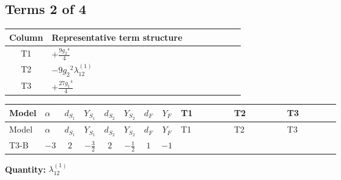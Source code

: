 \documentclass[8pt]{article}
\begin{document}
\begin{landscape}
\subsection*{Terms 2 of 4}
\begin{center}
\begin{tabular}{@{}c >{\raggedright\arraybackslash}p{0.82\linewidth}@{}}
\toprule
Column & Representative term structure \\
\midrule
T1 & \(\displaystyle +\frac{9 {g_2}^4}{4}\) \\
\midrule
T2 & \(\displaystyle -9 {g_2}^2 {\lambda_{12}^{(1)}}\) \\
\midrule
T3 & \(\displaystyle +\frac{27 {g_1}^4}{4}\) \\
\midrule
\bottomrule
\end{tabular}
\end{center}
\smallskip
\tiny
\begin{longtable}{@{}llcccccc >{\raggedright\arraybackslash}p{0.21\linewidth} >{\raggedright\arraybackslash}p{0.21\linewidth} >{\raggedright\arraybackslash}p{0.21\linewidth}@{}}
\toprule
Model & $\alpha$ & $d_{S_1}$ & $Y_{S_1}$ & $d_{S_2}$ & $Y_{S_2}$ & $d_F$ & $Y_F$ & T1 & T2 & T3 \\
\midrule
\endfirsthead
\toprule
Model & $\alpha$ & $d_{S_1}$ & $Y_{S_1}$ & $d_{S_2}$ & $Y_{S_2}$ & $d_F$ & $Y_F$ & T1 & T2 & T3 \\
\midrule
\endhead
T3-B & $-3$ & $2$ & $-\frac{3}{2}$ & $2$ & $-\frac{1}{2}$ & $1$ & $-1$ & \scriptsize\adjustbox{max width=\linewidth}{$\begin{gathered} +\frac{9 {g_2}^4}{4}\end{gathered}$} & \scriptsize\adjustbox{max width=\linewidth}{$\begin{gathered} -9 {g_2}^2 {\lambda_{12}^{(1)}}\end{gathered}$} & \scriptsize\adjustbox{max width=\linewidth}{$\begin{gathered} +\frac{27 {g_1}^4}{4}\end{gathered}$} \\
\midrule
\bottomrule
\end{longtable}
\clearpage
\noindent\textbf{Quantity: }$\lambda_{12}^{(1)}$\par\smallskip

\end{landscape}
\end{document}
